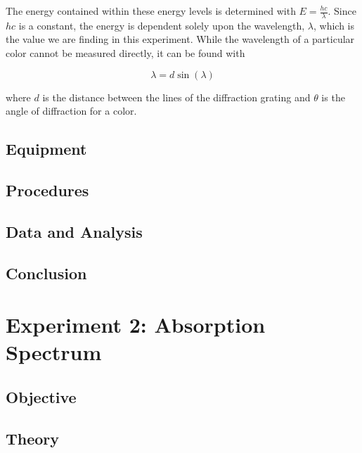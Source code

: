 \documentclass{article}
\begin{document}
\qq The energy contained within these energy levels is determined with \(E =
\frac{hc}{\lambda}\). Since \(hc\) is a constant, the energy is dependent solely
upon the wavelength, \(\lambda\), which is the value we are finding in this
experiment. While the wavelength of a particular color cannot be measured
directly, it can be found with

\begin{equation}
  \label{eqn:wavelength}
  \lambda = d \sin{(\lambda)}
\end{equation}

where \(d\) is the distance between the lines of the diffraction grating and
\(\theta\) is the angle of diffraction for a color.

\subsection{Equipment}

\qq

\subsection{Procedures}

\qq

\subsection{Data and Analysis}

\qq

\subsection{Conclusion}

\qq


\section{Experiment 2: Absorption Spectrum}


\subsection{Objective}

\qq

\subsection{Theory}
\end{document}
